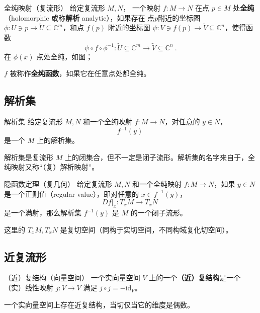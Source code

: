 \begin{definition}{全纯映射（复流形）}
给定复流形 $M, N$， 一个映射 $f: M \to N$ 在点 $p \in M$ 处\textbf{全纯}（holomorphic 或称\textbf{解析} analytic），如果存在 点$p$附近的坐标图 $\phi: U \ni p \to \tilde{U} \subseteq \mathbb{C}^m$，和点 $f(p)$ 附近的坐标图 $\psi: V \ni f(p) \to \tilde{V} \subseteq \mathbb{C}^n$，使得函数
$$
\psi \circ f \circ \phi^{-1}: \tilde{U} \subseteq \mathbb{C}^m \to \tilde{V} \subseteq \mathbb{C}^n~.
$$
在 $\phi(x)$ 点处全纯，如图；

$f$ 被称作\textbf{全纯函数}，如果它在任意点处都全纯。
\end{definition}



\subsection{解析集}

\begin{definition}{解析集}
给定复流形 $M, N$ 和一个全纯映射 $f: M \to N$，对任意的 $y \in N$，
$$
f^{-1}(y)~
$$
是一个 $M$ 上的解析集。
\end{definition}

解析集是复流形 $M$ 上的闭集合，但不一定是闭子流形。解析集的名字来自于，全纯映射又称“（复）解析映射”。

\begin{theorem}{隐函数定理（复几何）}
给定复流形 $M, N$ 和一个全纯映射 $f: M \to N$，如果 $y \in N$ 是一个正则值（regular value），即对任意的 $x \in f^{-1}(y)$，
$$
D f|_x: T_x M \to T_x N~
$$
是一个满射，那么解析集 $f^{-1}(y)$ 是 $M$ 的一个闭子流形。
\end{theorem}
这里的 $T_x M, T_x N$ 是复切空间（同构于实切空间，不同构域复化切空间）。


\subsection{近复流形}

\begin{definition}{（近）复结构（向量空间）}
一个实向量空间 $V$ 上的一个\textbf{（近）复结构}是一个（实）线性映射 $j: V \to V$ 满足 $j \circ j = - \text{id}_V$。
\end{definition}

\begin{theorem}{}
一个实向量空间上存在近复结构，当切仅当它的维度是偶数。
\end{theorem}

